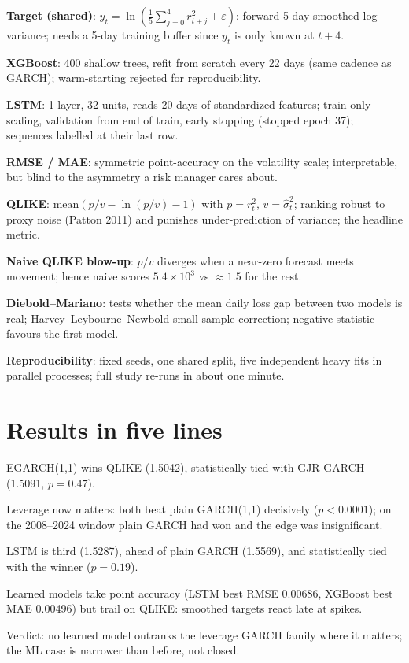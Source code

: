 \documentclass[a4paper,10pt]{article}
\newcommand{\term}[1]{\textbf{#1}:}
\begin{document}
\term{Target (shared)} $y_t=\ln(\frac15\sum_{j=0}^4 r_{t+j}^2+\varepsilon)$: forward 5-day smoothed log variance; needs a 5-day training buffer since $y_t$ is only known at $t+4$.

\term{XGBoost} 400 shallow trees, refit from scratch every 22 days (same cadence as GARCH); warm-starting rejected for reproducibility.

\term{LSTM} 1 layer, 32 units, reads 20 days of standardized features; train-only scaling, validation from end of train, early stopping (stopped epoch 37); sequences labelled at their last row.

\term{RMSE / MAE} symmetric point-accuracy on the volatility scale; interpretable, but blind to the asymmetry a risk manager cares about.

\term{QLIKE} $\mathrm{mean}(p/v-\ln(p/v)-1)$ with $p=r_t^2$, $v=\hat\sigma_t^2$; ranking robust to proxy noise (Patton 2011) and punishes under-prediction of variance; the headline metric.

\term{Naive QLIKE blow-up} $p/v$ diverges when a near-zero forecast meets movement; hence naive scores $5.4\times10^3$ vs $\approx 1.5$ for the rest.

\term{Diebold--Mariano} tests whether the mean daily loss gap between two models is real; Harvey--Leybourne--Newbold small-sample correction; negative statistic favours the first model.

\term{Reproducibility} fixed seeds, one shared split, five independent heavy fits in parallel processes; full study re-runs in about one minute.

\section*{Results in five lines}

EGARCH(1,1) wins QLIKE (1.5042), statistically tied with GJR-GARCH (1.5091, $p=0.47$).

Leverage now matters: both beat plain GARCH(1,1) decisively ($p<0.0001$); on the 2008--2024 window plain GARCH had won and the edge was insignificant.

LSTM is third (1.5287), ahead of plain GARCH (1.5569), and statistically tied with the winner ($p=0.19$).

Learned models take point accuracy (LSTM best RMSE 0.00686, XGBoost best MAE 0.00496) but trail on QLIKE: smoothed targets react late at spikes.

Verdict: no learned model outranks the leverage GARCH family where it matters; the ML case is narrower than before, not closed.
\end{document}
